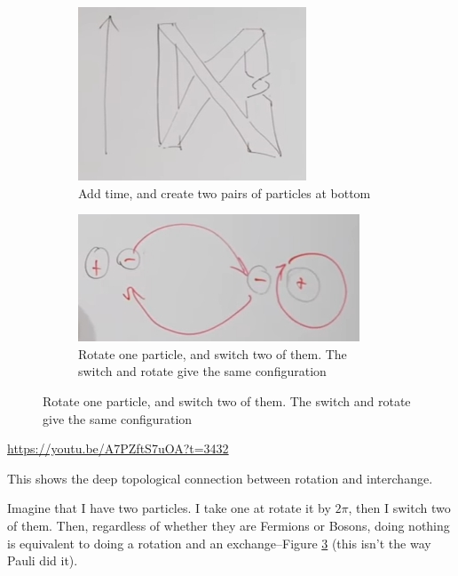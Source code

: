 \documentclass[]{article}
\begin{document}
\begin{figure}[H]
\begin{subfigure}[t]{0.24\textwidth}
	\end{subfigure}
	\begin{subfigure}[t]{0.24\textwidth}
		\caption{Add time, and create two pairs of particles at bottom}\label{fig:aqm-5-belt-legal-time}
		\includegraphics[width=\textwidth]{aqm-5-belt-legal-time}
	\end{subfigure}
	\begin{subfigure}[t]{0.24\textwidth}
		\caption{Rotate one particle, and switch two of them. The switch and rotate give the same configuration}\label{fig:belt_switch:rotate}
		\includegraphics[width=\textwidth]{aqm-5-belt-switch-rotate}
	\end{subfigure}
\end{figure}
\url{https://youtu.be/A7PZftS7uOA?t=3432}

This shows the deep topological connection between rotation and interchange.

Imagine that I have two particles. I take one at rotate it by $2\pi$, then I switch two of them. Then, regardless of whether they are Fermions or Bosons, doing nothing is equivalent to doing a rotation and an exchange--Figure \ref{fig:belt_switch:rotate} (this isn't the way Pauli did it).
\end{document}
